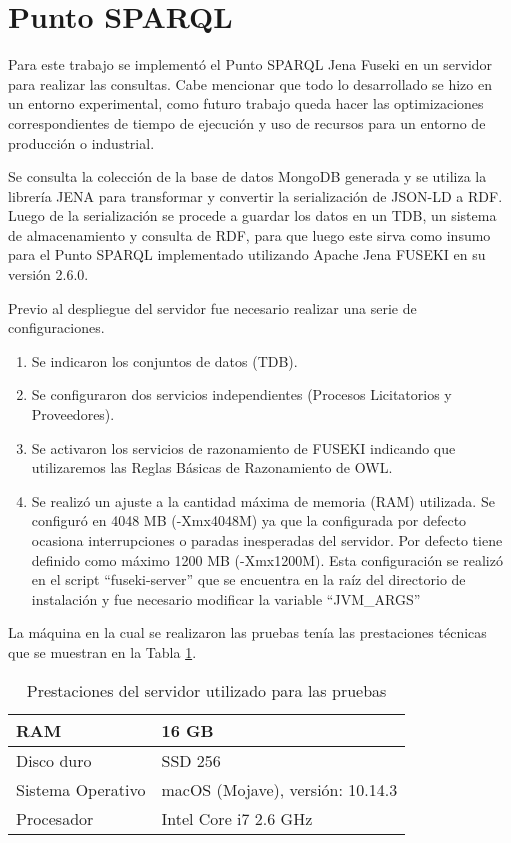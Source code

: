 \section{Punto SPARQL}
\label{section:puntosparql}

Para este trabajo se implementó el Punto SPARQL Jena Fuseki\cite{ApacheJe97:online} en un servidor para realizar las consultas. Cabe mencionar que todo lo desarrollado se hizo en un entorno experimental, como futuro trabajo queda hacer las optimizaciones correspondientes de tiempo de ejecución y uso de recursos para un entorno de producción o industrial.

Se consulta la colección de la base de datos MongoDB generada y se utiliza la librería JENA para transformar y convertir la serialización de JSON-LD a RDF. Luego de la serialización se procede a guardar los datos en un TDB, un sistema de almacenamiento y consulta de RDF, para que luego este sirva como insumo para el Punto SPARQL implementado utilizando Apache Jena FUSEKI en su versión 2.6.0.

Previo al despliegue del servidor fue necesario realizar una serie de configuraciones.

\begin{enumerate}
    \item Se indicaron los conjuntos de datos (TDB).
    \item Se configuraron dos servicios independientes (Procesos Licitatorios y Proveedores).
    \item Se activaron los servicios de razonamiento de FUSEKI indicando que utilizaremos las Reglas Básicas de Razonamiento de OWL. 
    \item Se realizó un ajuste a la cantidad máxima de memoria (RAM) utilizada. Se configuró en 4048 MB (-Xmx4048M) ya que la configurada por defecto ocasiona interrupciones o paradas inesperadas del servidor. Por defecto tiene definido como máximo 1200 MB (-Xmx1200M). Esta configuración se realizó en el script “fuseki-server” que se encuentra en la raíz del directorio de instalación y fue necesario modificar la variable “JVM\_ARGS” 

\end{enumerate}

La máquina en la cual se realizaron las pruebas tenía las prestaciones técnicas que se muestran en la Tabla \ref{tab:prestaciones_servidor}.


\begin{table}[!htb]
\centering
    \caption{Prestaciones del servidor utilizado para las pruebas}
    \label{tab:prestaciones_servidor}
\begin{tabular}{|l|l|}
\hline
 RAM & 16 GB\\\hline
    Disco duro & SSD 256\\\hline
    Sistema Operativo & macOS (Mojave), versión: 10.14.3\\\hline
    Procesador & Intel Core i7 2.6 GHz\\\hline
\end{tabular}
\end{table}


